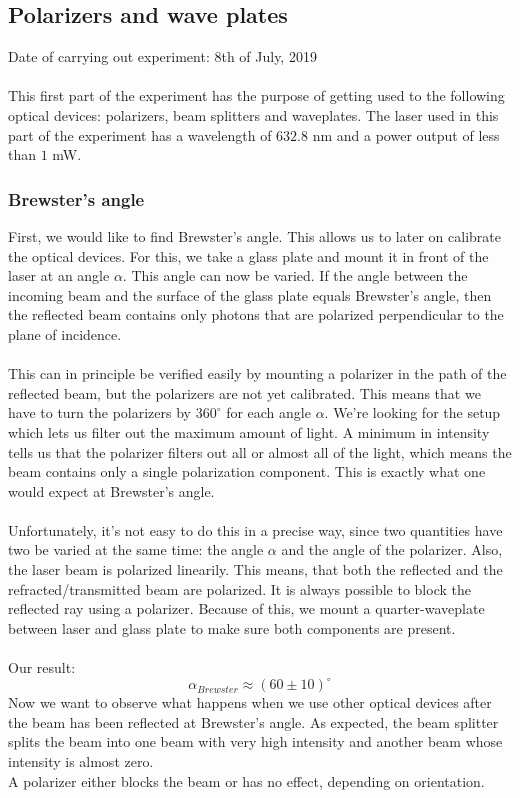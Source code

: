 \subsection{Polarizers and wave plates}
Date of carrying out experiment: 8th of July, 2019 \\ \\
This first part of the experiment has the purpose of getting used
to the following optical devices: polarizers, beam splitters and waveplates.
The laser used in this part of the experiment has a wavelength of $632.8$
nm and a power output of less than $1$ mW.

\subsubsection{Brewster's angle}
First, we would like to find Brewster's angle. This allows us to
later on calibrate the optical devices. For this, we take a glass plate
and mount it in front of the laser at an angle $\alpha$. This angle can now
be varied. If the angle between the incoming
beam and the surface of the glass plate equals Brewster's 
angle, then the reflected beam contains only photons that are polarized
perpendicular to the plane of incidence. \\ \\ This can in principle
be verified easily by mounting a polarizer in the path of the reflected
beam, but the polarizers are not yet calibrated. This means that we have
to turn the polarizers by $360^\circ$ for each angle $\alpha$. We're
looking for the setup which lets us filter out the maximum amount of light.
A minimum in intensity tells us that the polarizer filters out all or
almost all
of the light, which means the beam contains only a single polarization
component. This is exactly what one would expect at Brewster's angle. \\ \\
Unfortunately, it's not easy to do this in a precise way, since two
quantities have two be varied at the same time: the angle $\alpha$ and
the angle of the polarizer. Also, the laser beam is polarized linearily.
This means, that both the reflected and the refracted/transmitted beam
are polarized. It is always possible to block the reflected ray using a
polarizer. Because of this, we mount a quarter-waveplate between
laser and glass plate to make sure both components are present. \\ \\
Our result:
$$\alpha_{Brewster}\approx(60\pm10)^\circ$$
Now we want to observe what happens when we use other optical devices after
the beam has been reflected at Brewster's angle. As expected, the beam
splitter splits the beam into one beam with very high intensity and
another beam whose intensity is almost zero. \\
A polarizer either blocks the beam or has no effect,
depending on orientation.

